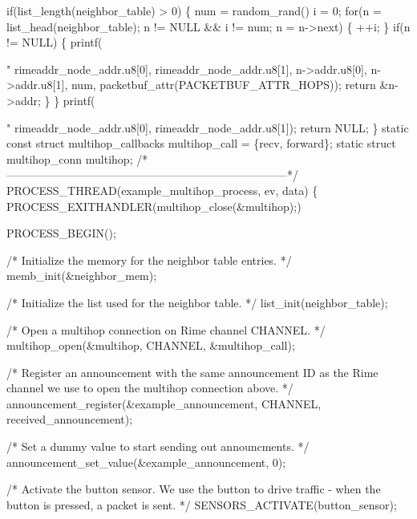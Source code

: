 \begin{DoxyCodeInclude}
{{  \textcolor{keywordflow}{if}(list\_length(neighbor\_table) > 0) \{
    num = random\_rand() %
    i = 0;
    \textcolor{keywordflow}{for}(n = list\_head(neighbor\_table); n != NULL && i != num; n = n->next) \{
      ++i;
    \}
    \textcolor{keywordflow}{if}(n != NULL) \{
      printf(\textcolor{stringliteral}{"%
             rimeaddr\_node\_addr.u8[0], rimeaddr\_node\_addr.u8[1],
             n->addr.u8[0], n->addr.u8[1], num,
             packetbuf\_attr(PACKETBUF\_ATTR\_HOPS));
      \textcolor{keywordflow}{return} &n->addr;
    \}
  \}
  printf(\textcolor{stringliteral}{"%
         rimeaddr\_node\_addr.u8[0], rimeaddr\_node\_addr.u8[1]);
  \textcolor{keywordflow}{return} NULL;
\}
\textcolor{keyword}{static} \textcolor{keyword}{const} \textcolor{keyword}{struct }multihop\_callbacks multihop\_call = \{recv, forward\};
\textcolor{keyword}{static} \textcolor{keyword}{struct }multihop\_conn multihop;
\textcolor{comment}{/*---------------------------------------------------------------------------*/}
PROCESS\_THREAD(example\_multihop\_process, ev, data)
\{
  PROCESS\_EXITHANDLER(multihop\_close(&multihop);)
    
  PROCESS\_BEGIN();

  \textcolor{comment}{/* Initialize the memory for the neighbor table entries. */}
  memb\_init(&neighbor\_mem);

  \textcolor{comment}{/* Initialize the list used for the neighbor table. */}
  list\_init(neighbor\_table);

  \textcolor{comment}{/* Open a multihop connection on Rime channel CHANNEL. */}
  multihop\_open(&multihop, CHANNEL, &multihop\_call);

  \textcolor{comment}{/* Register an announcement with the same announcement ID as the}
\textcolor{comment}{     Rime channel we use to open the multihop connection above. */}
  announcement\_register(&example\_announcement,
                        CHANNEL,
                        received\_announcement);

  \textcolor{comment}{/* Set a dummy value to start sending out announcments. */}
  announcement\_set\_value(&example\_announcement, 0);

  \textcolor{comment}{/* Activate the button sensor. We use the button to drive traffic -}
\textcolor{comment}{     when the button is pressed, a packet is sent. */}
  SENSORS\_ACTIVATE(button\_sensor);

}}}}
\end{DoxyCodeInclude}
